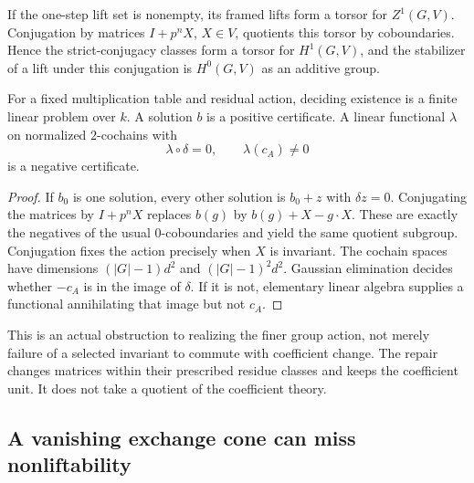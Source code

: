 \begin{proposition}\label{prop:repair-H1}
If the one-step lift set is nonempty, its framed lifts form a torsor for $Z^1(G,V)$. Conjugation by matrices $I+p^nX$, $X\in V$, quotients this torsor by coboundaries. Hence the strict-conjugacy classes form a torsor for $H^1(G,V)$, and the stabilizer of a lift under this conjugation is $H^0(G,V)$ as an additive group.

For a fixed multiplication table and residual action, deciding existence is a finite linear problem over $k$. A solution $b$ is a positive certificate. A linear functional $\lambda$ on normalized $2$-cochains with
\[
 \lambda\circ\delta=0,\qquad \lambda(c_A)\ne0
\]
is a negative certificate.
\end{proposition}
\begin{proof}
If $b_0$ is one solution, every other solution is $b_0+z$ with $\delta z=0$. Conjugating the matrices by $I+p^nX$ replaces $b(g)$ by $b(g)+X-g\cdot X$. These are exactly the negatives of the usual $0$-coboundaries and yield the same quotient subgroup. Conjugation fixes the action precisely when $X$ is invariant. The cochain spaces have dimensions $(|G|-1)d^2$ and $(|G|-1)^2d^2$. Gaussian elimination decides whether $-c_A$ is in the image of $\delta$. If it is not, elementary linear algebra supplies a functional annihilating that image but not $c_A$.
\end{proof}

This is an actual obstruction to realizing the finer group action, not merely failure of a selected invariant to commute with coefficient change. The repair changes matrices within their prescribed residue classes and keeps the coefficient unit. It does not take a quotient of the coefficient theory.

\subsection{A vanishing exchange cone can miss nonliftability}

